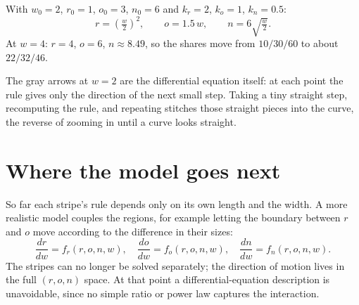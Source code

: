 \documentclass[11pt]{article}
\begin{document}
With $w_0 = 2$, $r_0=1$, $o_0=3$, $n_0=6$ and $k_r=2$, $k_o=1$, $k_n=0.5$:
\[
  r = \left(\tfrac{w}{2}\right)^2,\qquad
  o = 1.5\,w,\qquad
  n = 6\sqrt{\tfrac{w}{2}} .
\]
At $w=4$: $r = 4$, $o = 6$, $n \approx 8.49$, so the shares move from $10/30/60$ to about $22/32/46$.

\begin{center}
\end{center}

The gray arrows at $w=2$ are the differential equation itself: at each point the rule gives only the direction of the next small step. Taking a tiny straight step, recomputing the rule, and repeating stitches those straight pieces into the curve, the reverse of zooming in until a curve looks straight.

\section{Where the model goes next}

So far each stripe's rule depends only on its own length and the width. A more realistic model couples the regions, for example letting the boundary between $r$ and $o$ move according to the difference in their sizes:
\[
  \frac{dr}{dw} = f_r(r,o,n,w),\quad
  \frac{do}{dw} = f_o(r,o,n,w),\quad
  \frac{dn}{dw} = f_n(r,o,n,w).
\]
The stripes can no longer be solved separately; the direction of motion lives in the full $(r,o,n)$ space. At that point a differential-equation description is unavoidable, since no simple ratio or power law captures the interaction.
\end{document}
